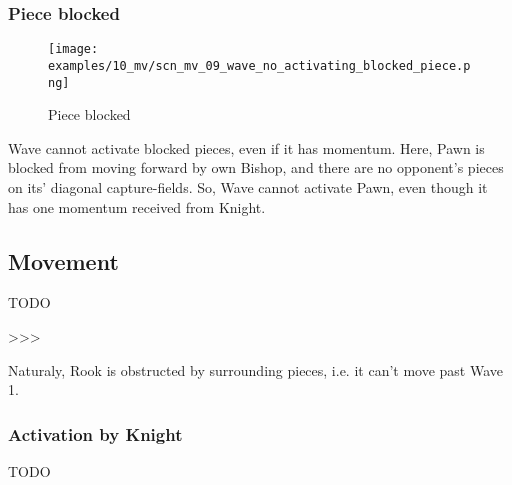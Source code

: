 \subsubsection*{Piece blocked}

\vspace*{-3.0ex}
\noindent
\begin{figure}[h]
\texttt{[image: examples/10\_mv/scn\_mv\_09\_wave\_no\_activating\_blocked\_piece.png]}
\caption{Piece blocked}
\label{fig:scn_mv_09_wave_no_activating_blocked_piece}
\end{figure}

Wave cannot activate blocked pieces, even if it has momentum. Here, Pawn is blocked
from moving forward by own Bishop, and there are no opponent's pieces on its'
diagonal capture-fields. So, Wave cannot activate Pawn, even though it has one
momentum received from Knight.

\clearpage %

\subsection*{Movement}


\huge
TODO
\normalsize

\textgreater \textgreater \textgreater

Naturaly, Rook is obstructed by surrounding pieces, i.e. it can't move past Wave 1.

\clearpage %

\subsubsection*{Activation by Knight}

\huge
TODO
\normalsize

\clearpage %

